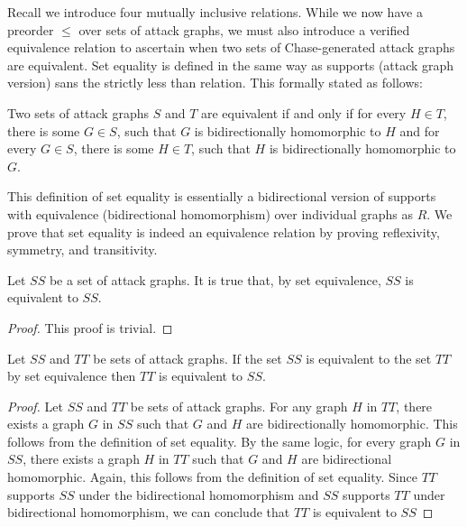 \documentclass[runningheads]{llncs}
\theoremstyle{definition}
\begin{document}
Recall we introduce four mutually inclusive relations. While we now have a preorder $\leq$ over sets of attack graphs, we must also introduce a verified equivalence relation to ascertain when two sets of Chase-generated attack graphs are equivalent. Set equality is defined in the same way as supports (attack graph version) sans the strictly less than relation. This formally stated as follows: 

\begin{definition}
    Two sets of attack graphs $S$ and $T$ are equivalent if and only if for every $H \in T$, there is some $G \in S$, such that $G$ is bidirectionally homomorphic to $H$ and for every $G \in S$, there is some $H \in T$, such that $H$ is bidirectionally homomorphic to $G$.
\end{definition}

This definition of set equality is essentially a bidirectional version of supports with equivalence (bidirectional homomorphism) over individual graphs as $R$. We prove that set equality is indeed an equivalence relation by proving reflexivity, symmetry, and transitivity. 

\begin{theorem}
    Let $SS$ be a set of attack graphs. It is true that, by set equivalence, $SS$ is equivalent to $SS$.
\end{theorem}
\begin{proof}
    This proof is trivial.  
\end{proof}


\begin{theorem}
    Let $SS$ and $TT$ be sets of attack graphs. If the set $SS$ is equivalent to the set $TT$ by set equivalence then $TT$ is equivalent to $SS$. 
\end{theorem}
\begin{proof}
    Let $SS$ and $TT$ be sets of attack graphs. For any graph $H$ in $TT$, there exists a graph $G$ in $SS$ such that $G$ and $H$ are bidirectionally homomorphic. This follows from the definition of set equality. By the same logic, for every graph $G$ in $SS$, there exists a graph $H$ in $TT$ such that $G$ and $H$ are bidirectional homomorphic. Again, this follows from the definition of set equality. Since $TT$ supports $SS$ under the bidirectional homomorphism and $SS$ supports $TT$ under bidirectional homomorphism, we can conclude that $TT$ is equivalent to $SS$ 
\end{proof}
\end{document}

